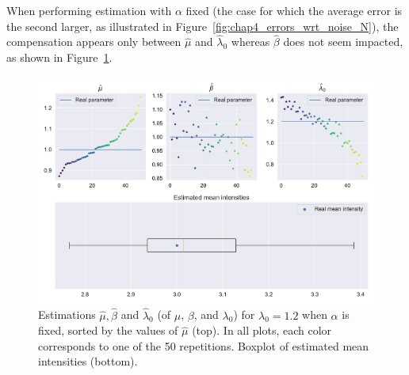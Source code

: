     When performing estimation with $\alpha$ fixed (the case for which the average error is the second larger, as illustrated in Figure~\ref{fig:chap4_errors_wrt_noise_N}), the compensation appears only between $\hat \mu$ and $\hat \lambda_0$ whereas $\hat \beta$ does not seem impacted, as shown in Figure~\ref{fig:chap4_uni_compensation_alpha_N}.

        \begin{figure}[!ht]
        \centering
        \includegraphics[width=\textwidth]{images/chapter4//compensation_alpha_N.pdf}
        \caption{Estimations $\hat \mu, \hat \beta$ and $\hat \lambda_0$ (of $\mu$, $\beta$, and $\lambda_0$) for
        $\lambda_0 = 1.2$ when $\alpha$ is fixed,
        sorted by the values of $\hat{\mu}$ (top).
        In all plots, each color corresponds to one of the 50 repetitions. Boxplot of estimated mean intensities (bottom).}
        \label{fig:chap4_uni_compensation_alpha_N}
        \end{figure}


     
        
